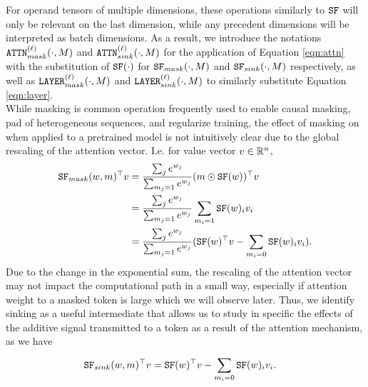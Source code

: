 For operand tensors of multiple dimensions, these operations similarly to $\sf$ will only be relevant on the last dimension, while any precedent dimensions will be interpreted as batch dimensions. As a result, we introduce the notations $\attnm{\ell}(\cdot, M)$ and $\attns{\ell}(\cdot, M)$ for the application of Equation \ref{eqn:attn} with the substitution of $\sf(\cdot)$ for $\sfm(\cdot, M)$ and $ \sfs(\cdot, M)$ respectively, as well as $\lyrm{\ell}(\cdot, M)$ and $\lyrs{\ell}(\cdot, M)$ to similarly substitute Equation \ref{eqn:layer}. \\

While masking is common operation frequently used to enable causal masking, pad of heterogeneous sequences, and regularize training, the effect of masking on when applied to a pretrained model is not intuitively clear due to the global rescaling of the attention vector. I.e. for value vector $v \in \R^n$, \begin{align}
    \tr{\sfm(w, m)}v
    & = \frac{\dss{j}{} e^{w_j}}{\dss{m_j = 1}{} e^{w_j}} \tr{(m \odot \sf(w))}v   \\
    & = \frac{\dss{j}{} e^{w_j}}{\dss{m_j = 1}{} e^{w_j}} \dss{m_i = 1}{} \sf(w)_iv_i    \\
    & = \frac{\dss{j}{} e^{w_j}}{\dss{m_j = 1}{} e^{w_j}} (\tr{\sf(w)}v - \dss{m_i = 0}{} \sf(w)_iv_i).
\end{align} Due to the change in the exponential sum, the rescaling of the attention vector may not impact the computational path in a small way, especially if attention weight to a masked token is large which we will observe later. Thus, we identify sinking as a useful intermediate that allows us to study in specific the effects of the additive signal transmitted to a token as a result of the attention mechanism, as we have \begin{align}
    \tr{\sfs(w, m)}v
    & = \tr{\sf(w)}v - \dss{m_i = 0}{} \sf(w)_iv_i.
\end{align}


